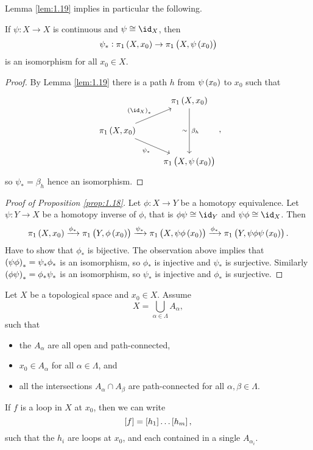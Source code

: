 Lemma \ref{lem:1.19} implies in particular the following.

\begin{corollary}
If $ \psi : X \to X $ is continuous and $ \psi \cong \id_X $, then
$$ \psi_* : \pi_1\br{X, x_0} \to \pi_1\br{X, \psi\br{x_0}} $$
is an isomorphism for all $ x_0 \in X $.
\end{corollary}

\begin{proof}
By Lemma \ref{lem:1.19} there is a path $ h $ from $ \psi\br{x_0} $ to $ x_0 $ such that
$$
\begin{tikzcd}
& \pi_1\br{X, x_0} \arrow{dd}{\beta_h}[swap]{\sim} \\
\pi_1\br{X, x_0} \arrow{ur}{\br{\id_X}_*} \arrow{dr}[swap]{\psi_*} & \\
& \pi_1\br{X, \psi\br{x_0}}
\end{tikzcd},
$$
so $ \psi_* = \beta_h $ hence an isomorphism.
\end{proof}

\pagebreak

\begin{proof}[Proof of Proposition \ref{prop:1.18}]
Let $ \phi : X \to Y $ be a homotopy equivalence. Let $ \psi : Y \to X $ be a homotopy inverse of $ \phi $, that is $ \phi\psi \cong \id_Y $ and $ \psi\phi \cong \id_X $. Then
$$ \pi_1\br{X, x_0} \xrightarrow{\phi_*} \pi_1\br{Y, \phi\br{x_0}} \xrightarrow{\psi_*} \pi_1\br{X, \psi\phi\br{x_0}} \xrightarrow{\phi_*} \pi_1\br{Y, \psi\phi\psi\br{x_0}}. $$
Have to show that $ \phi_* $ is bijective. The observation above implies that $ \br{\psi\phi}_* = \psi_*\phi_* $ is an isomorphism, so $ \phi_* $ is injective and $ \psi_* $ is surjective. Similarly $ \br{\phi\psi}_* = \phi_*\psi_* $ is an isomorphism, so $ \psi_* $ is injective and $ \phi_* $ is surjective.
\end{proof}

\begin{lemma}
\label{lem:1.15}
Let $ X $ be a topological space and $ x_0 \in X $. Assume
$$ X = \bigcup_{\alpha \in \Lambda} A_\alpha, $$
such that
\begin{itemize}
\item the $ A_\alpha $ are all open and path-connected,
\item $ x_0 \in A_\alpha $ for all $ \alpha \in \Lambda $, and
\item all the intersections $ A_\alpha \cap A_\beta $ are path-connected for all $ \alpha, \beta \in \Lambda $.
\end{itemize}
If $ f $ is a loop in $ X $ at $ x_0 $, then we can write
$$ \sbr{f} = \sbr{h_1} \dots \sbr{h_m}, $$
such that the $ h_i $ are loops at $ x_0 $, and each contained in a single $ A_{\alpha_i} $.
\end{lemma}

